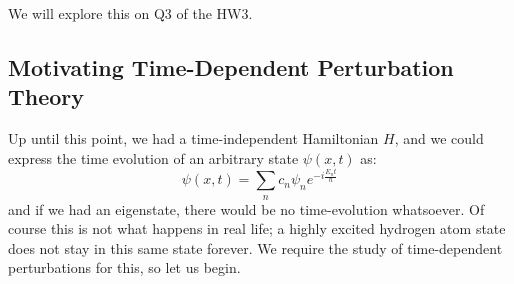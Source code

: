 We will explore this on Q3 of the HW3.

\subsection{Motivating Time-Dependent Perturbation Theory}
Up until this point, we had a time-independent Hamiltonian $H$, and we could express the time evolution of an arbitrary state $\psi(x, t)$ as:
\begin{equation}
    \psi(x, t) = \sum_n c_n \psi_n e^{-i\frac{E_n t}{\hbar}}
\end{equation}
and if we had an eigenstate, there would be no time-evolution whatsoever. Of course this is not what happens in real life; a highly excited hydrogen atom state does not stay in this same state forever. We require the study of time-dependent perturbations for this, so let us begin.

